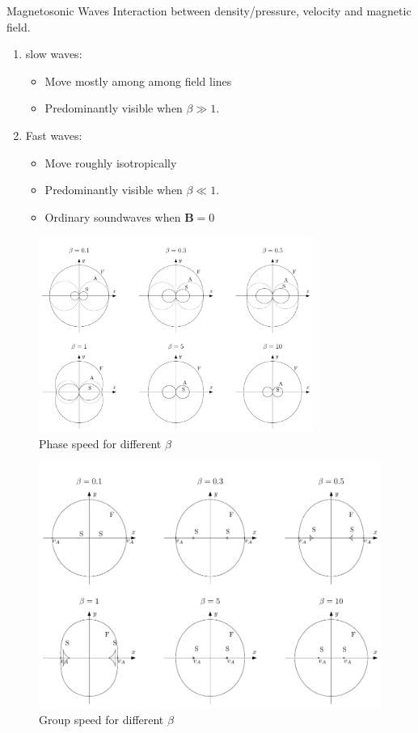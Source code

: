 \documentclass{beamer}
\begin{document}
\begin{frame}{Magnetosonic Waves}
	Interaction between density/pressure, velocity and magnetic field. 
	\begin{enumerate}
		\item slow waves:
			\begin{itemize}
				\item Move mostly among among field lines
				\item Predominantly visible when $\beta \gg 1$.
			\end{itemize}
		\item Fast waves:
			\begin{itemize}
				\item Move roughly isotropically 
				\item Predominantly visible when $\beta \ll 1$.
				\item Ordinary soundwaves when $\mathbf B = 0$
			\end{itemize}
	\end{enumerate}
\end{frame}
\begin{frame}
	\begin{figure}[h]
		\centering
		\includegraphics[width=0.8\textwidth]{../report/figures/fasespeed_beta.pdf}
		\caption{Phase speed for different $\beta$}	
	\end{figure}
\end{frame}
\begin{frame}
	\begin{figure}[h]
		\centering
		\includegraphics[width=.9\textwidth]{../report/figures/groupspeed_beta.pdf}
		\caption{Group speed for different $\beta$}
	\end{figure}	
\end{frame}
\end{document}
